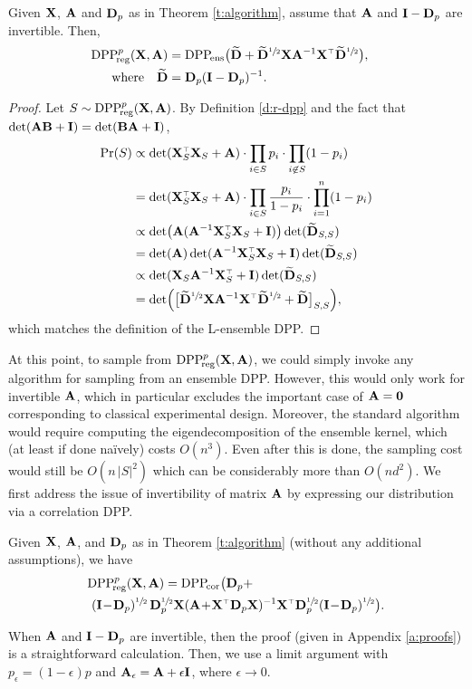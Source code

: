 \documentclass[11pt]{article}
\begin{document}
\vspace{2mm}
\begin{lemma}\label{t:reduction}
  Given $\mathbf X$, $\mathbf A$ and $\mathbf D_p$ as in Theorem \ref{t:algorithm}, assume that $\mathbf A$ and $\mathbf I-\mathbf D_p$ are
  invertible. Then,
  \begin{align*}
    \DPPreg{p}(\X,\A)&=\DPPens\big(\Dbt+
    \Dbt^{\sfrac12}\X\A^{-1}\X^\top
    \Dbt^{\sfrac12}\big),\quad\\
    \text{where}
    \quad\Dbt &= \D_p(\I-\D_p)^{-1}.
  \end{align*}
\end{lemma}
\begin{proof}
  Let $S\sim {{\mathrm{DPP}}_{\!\mathrm{reg}}^{p}}(\mathbf X,\mathbf A)$. By Definition \ref{d:r-dpp} and
  the fact that $\det(\mathbf A\mathbf B+\mathbf I)=\det(\mathbf B\mathbf A+\mathbf I)$,
  \begin{align*}
    \Pr(S) &\propto \det(\X_S^\top\X_S+\A)\cdot
\prod_{i\in S}p_i\cdot\prod_{i\not\in S}(1-p_i) \\
&= \det(\X_S^\top\X_S+\A)\cdot
\prod_{i\in S}\frac{p_i}{1-p_i}\cdot\prod_{i=1}^n(1-p_i)
\\ &\propto\det\!\big(\A(\A^{-1}\X_S^\top\X_S+\I)\big) \det(\Dbt_{S,S}) \\
     &=\det(\A)\det(\A^{-1}\X_S^\top\X_S+\I) \det(\Dbt_{S,S})
\\ &\propto \det(\X_S \A^{-1}\X_S^\top+\I) \det(\Dbt_{S,S}) \\
&=\det\!\Big(\big[\Dbt^{\sfrac12}\X \A^{-1}\X^\top\Dbt^{\sfrac12}+\Dbt\big]_{S,S}\Big),
  \end{align*}
which matches the definition of the L-ensemble DPP.
\end{proof}
 At this point, to sample from  ${{\mathrm{DPP}}_{\!\mathrm{reg}}^{p}}(\mathbf X,\mathbf A)$, we could simply
invoke any algorithm for sampling from
an ensemble DPP. However, this would only work for invertible
$\mathbf A$, which in particular excludes the important case of
$\mathbf A=\mathbf 0$ corresponding to classical experimental
design. Moreover, the standard algorithm would require computing the
eigendecomposition of the ensemble kernel, which (at
least if done na\"ively) costs $O(n^3)$. Even after this is done, the
sampling cost would still be $O(n\,|S|^2)$ which can be considerably
more than $O(nd^2)$. We first address the issue of invertibility of matrix
$\mathbf A$ by expressing our distribution via a correlation DPP.
\begin{lemma}\label{l:correlation}
  Given $\mathbf X$, $\mathbf A$, and $\mathbf D_p$ as in Theorem \ref{t:algorithm} (without
  any additional assumptions), we have
  \begin{align*}
    &\DPPreg{p}(\X,\A) 
    = \DPPcor\big(\D_p + \\
    &\ (\I\!-\!\D_p)^{\sfrac12}\,\D_p^{\sfrac12}\X(\A\!+\!\X^\top\D_p\X)^{-1}\X^\top\D_p^{\sfrac12}(\I\!-\!\D_p)^{\sfrac12}\big).
    \end{align*}
  \end{lemma}
  When $\mathbf A$ and $\mathbf I-\mathbf D_p$ are invertible, then the proof (given in
  Appendix \ref{a:proofs}) is a straightforward calculation.
Then, we use a limit argument with $p_\epsilon=(1-\epsilon)p$ and
$\mathbf A_\epsilon=\mathbf A+\epsilon\mathbf I$, where $\epsilon\rightarrow 0$.
\end{document}
